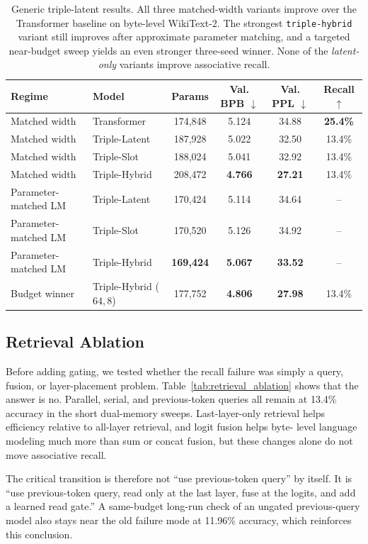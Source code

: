 \documentclass[11pt]{article}
\begin{document}
\begin{table}[t]
\centering
\small
\begin{tabular}{llcccc}
\toprule
Regime & Model & Params & Val. BPB $\downarrow$ & Val. PPL $\downarrow$ & Recall $\uparrow$ \\
\midrule
Matched width & Transformer & 174{,}848 & 5.124 & 34.88 & \textbf{25.4\%} \\
Matched width & Triple-Latent & 187{,}928 & 5.022 & 32.50 & 13.4\% \\
Matched width & Triple-Slot & 188{,}024 & 5.041 & 32.92 & 13.4\% \\
Matched width & Triple-Hybrid & 208{,}472 & \textbf{4.766} & \textbf{27.21} & 13.4\% \\
Parameter-matched LM & Triple-Latent & 170{,}424 & 5.114 & 34.64 & -- \\
Parameter-matched LM & Triple-Slot & 170{,}520 & 5.126 & 34.92 & -- \\
Parameter-matched LM & Triple-Hybrid & \textbf{169{,}424} & \textbf{5.067} & \textbf{33.52} & -- \\
Budget winner & Triple-Hybrid ($64,8$) & 177{,}752 & \textbf{4.806} & \textbf{27.98} & 13.4\% \\
\bottomrule
\end{tabular}
\caption{Generic triple-latent results. All three matched-width variants
improve over the Transformer baseline on byte-level WikiText-2. The strongest
\texttt{triple-hybrid} variant still improves after approximate parameter
matching, and a targeted near-budget sweep yields an even stronger three-seed
winner. None of the \emph{latent-only} variants improve associative recall.}
\label{tab:generic}
\end{table}

\subsection{Retrieval Ablation}
Before adding gating, we tested whether the recall failure was simply a query,
fusion, or layer-placement problem. Table~\ref{tab:retrieval_ablation} shows
that the answer is no. Parallel, serial, and previous-token queries all remain
at 13.4\% accuracy in the short dual-memory sweeps. Last-layer-only retrieval
helps efficiency relative to all-layer retrieval, and logit fusion helps byte-
level language modeling much more than sum or concat fusion, but these changes
alone do not move associative recall.

The critical transition is therefore not ``use previous-token query'' by
itself. It is ``use previous-token query, read only at the last layer, fuse at
the logits, and add a learned read gate.'' A same-budget long-run check of an
ungated previous-query model also stays near the old failure mode at 11.96\%
accuracy, which reinforces this conclusion.
\end{document}

